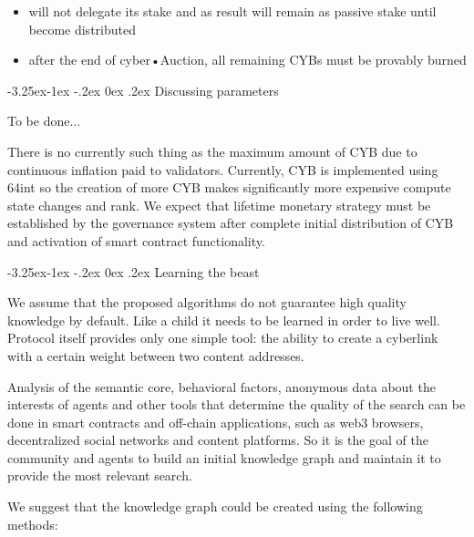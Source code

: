\documentclass[8pt,oneside]{amsart}
\makeatletter
\renewcommand\subsection{\@startsection{subsection}{2}{\z@}%
                                     {-3.25ex\@plus -1ex \@minus -.2ex}%
                                     {0ex \@plus .2ex}%
                                     {\play\Large}}%
\newcommand{\titleSection}[1]{\subsection{#1}}
\makeatother
\begin{document}
\begin{itemize}
\item will not delegate its stake and as result will remain as passive stake until become distributed
\item after the end of cyber•Auction, all remaining CYBs must be provably burned
\end{itemize}

\titleSection{Discussing parameters}\label{params}

To be done...

There is no currently such thing as the maximum amount of CYB due to continuous inflation paid to validators. Currently, CYB is implemented using 64int so the creation of more CYB makes significantly more expensive compute state changes and rank. We expect that lifetime monetary strategy must be established by the governance system after complete initial distribution of CYB and activation of smart contract functionality.


\titleSection{Learning the beast}\label{Learning the Graph}

We assume that the proposed algorithms do not guarantee high quality knowledge by default. Like a child it needs to be learned in order to live well. Protocol itself provides only one simple tool: the ability to create a cyberlink with a certain weight between two content addresses.

Analysis of the semantic core, behavioral factors, anonymous data about the interests of agents and other tools that determine the quality of the search can be done in smart contracts and off-chain applications, such as web3 browsers, decentralized social networks and content platforms. So it is the goal of the community and agents to build an initial knowledge graph and maintain it to provide the most relevant search.

We suggest that the knowledge graph could be created using the following methods:
\end{document}
